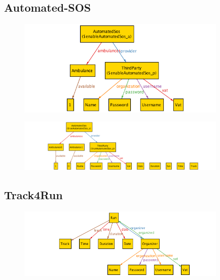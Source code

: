 \documentclass[a4paper]{article}
\begin{document}
\subsection{Automated-SOS}
    
    
    
    \begin{figure}[!htpb]
    	\centering
    	\includegraphics[width=100mm]{images/alloy/enableSos.png}
    \end{figure}
    
    
    \begin{figure}[!h]
    	\centering
    	\includegraphics[width=100mm]{images/alloy/runSos.png}
    \end{figure}

\subsection{Track4Run}
    
    
    
    \begin{figure}[!htpb]
    	\centering
    	\includegraphics[width=100mm]{images/alloy/createRun.png}
    \end{figure}
    
\end{document}
